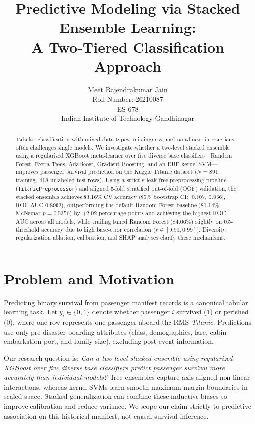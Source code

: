\documentclass{article}
\title{Predictive Modeling via Stacked Ensemble Learning:\\A Two-Tiered Classification Approach}
\author{%
  Meet Rajendrakumar Jain \\
  Roll Number: 26210087 \\
  ES 678 \\
  Indian Institute of Technology Gandhinagar
}
\begin{document}
\maketitle

\begin{abstract}
Tabular classification with mixed data types, missingness, and non-linear interactions often challenges single models. We investigate whether a two-level stacked ensemble using a regularized XGBoost meta-learner over five diverse base classifiers---Random Forest, Extra Trees, AdaBoost, Gradient Boosting, and an RBF-kernel SVM---improves passenger survival prediction on the Kaggle Titanic dataset ($N=891$ training, $418$ unlabeled test rows). Using a strictly leak-free preprocessing pipeline (\texttt{TitanicPreprocessor}) and aligned 5-fold stratified out-of-fold (OOF) validation, the stacked ensemble achieves 83.16\% CV accuracy (95\% bootstrap CI: [0.807, 0.856], ROC-AUC 0.8902), outperforming the default Random Forest baseline (81.14\%, McNemar $p = 0.0356$) by +2.02 percentage points and achieving the highest ROC-AUC across all models, while trailing tuned Random Forest (84.06\%) slightly on 0.5-threshold accuracy due to high base-error correlation ($r \in [0.91, 0.99]$). Diversity, regularization ablation, calibration, and SHAP analyses clarify these mechanisms.
\end{abstract}

\section{Problem and Motivation}
Predicting binary survival from passenger manifest records is a canonical tabular learning task. Let $y_i \in \{0, 1\}$ denote whether passenger $i$ survived ($1$) or perished ($0$), where one row represents one passenger aboard the RMS \textit{Titanic}. Predictions use only pre-disaster boarding attributes (class, demographics, fare, cabin, embarkation port, and family size), excluding post-event information.

Our research question is: \textit{Can a two-level stacked ensemble using regularized XGBoost over five diverse base classifiers predict passenger survival more accurately than individual models?} Tree ensembles capture axis-aligned non-linear interactions, whereas kernel SVMs learn smooth maximum-margin boundaries in scaled space. Stacked generalization \citep{wolpert1992stacked} can combine these inductive biases to improve calibration and reduce variance. We scope our claim strictly to predictive association on this historical manifest, not causal survival inference.
\end{document}
